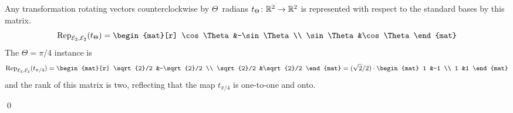 \documentclass[10pt,t]{beamer}
\begin{document}
\begin{frame}
\ex
Any transformation rotating vectors 
counterclockwise by $\Theta$~radians $\mbox{$t_\Theta\colon \mathbb{R}^2\to \mathbb{R}^2$}$ 
is represented with respect to the
standard bases by this matrix.
\begin{equation*}
  \rep{t_\Theta}{\stdbasis_2,\stdbasis_2}
  =
  \begin{mat}[r]
    \cos\Theta  &-\sin\Theta  \\
    \sin\Theta  &\cos\Theta
  \end{mat}
\end{equation*}
The $\Theta=\pi/4$ instance is
\begin{equation*}
  \rep{t_{\pi/4}}{\stdbasis_2,\stdbasis_2}
  =
  \begin{mat}[r]
    \sqrt{2}/2  &-\sqrt{2}/2  \\
    \sqrt{2}/2  &\sqrt{2}/2
  \end{mat}
  =(\sqrt{2}/2)\cdot
  \begin{mat}
    1  &-1  \\
    1  &1
  \end{mat}
\end{equation*}
and the rank of this matrix is two, reflecting
that the map $t_{\pi/4}$ is one-to-one and onto. 
\end{frame}




\begin{frame}
\df[df:NonsingularMap]




\pause
\lm[le:NonsingMatIffNonsingMap]
\pause
\pf
{}

\pause
{}
\qed
\end{frame}
\end{document}
